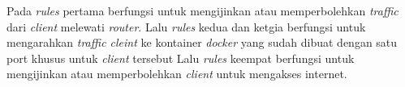 Pada \textit{rules} pertama berfungsi untuk mengijinkan atau memperbolehkan \textit{traffic} dari \textit{client} melewati \textit{router}. Lalu \textit{rules} kedua dan ketgia berfungsi untuk mengarahkan \textit{traffic cleint} ke kontainer \textit{docker} yang sudah dibuat dengan satu port khusus untuk \textit{client} tersebut Lalu \textit{rules} keempat berfungsi untuk mengijinkan atau memperbolehkan \textit{client} untuk mengakses internet.
